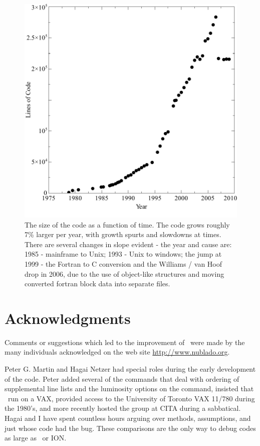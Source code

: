 \begin{figure}
\centering
\includegraphics{size}
\caption[\Cloudy's size vs time]{\label{fig:size}The size of the code as a function of time. The code grows roughly
7\% larger per year, with growth spurts and slowdowns at times. There are
several changes in slope evident - the year and cause are: 1985 - mainframe
to Unix; 1993 - Unix to windows; the jump at 1999 - the Fortran to C
conversion and the Williams / van Hoof drop in 2006, due to the use of
object-like structures and moving converted fortran block data into separate
files.}
\end{figure}

\section{Acknowledgments}

Comments or suggestions which led to the improvement of \Cloudy\ were made
by the many individuals acknowledged on the web site
\href{http://www.nublado.org}{http://www.nublado.org}.

Peter G. Martin and Hagai Netzer had special roles during the early
development of the code.  Peter added several of the commands that deal
with ordering of supplemental line lists and the luminosity options on the
 command, insisted that \Cloudy\ run on a VAX, provided access to
the University of Toronto VAX 11/780 during the 1980's, and more recently
hosted the group at CITA during a sabbatical.  Hagai and I have spent
countless hours arguing over methods, assumptions, and just whose code had
the bug.  These comparisons are the only way to debug codes as large as
\Cloudy\ or ION.

